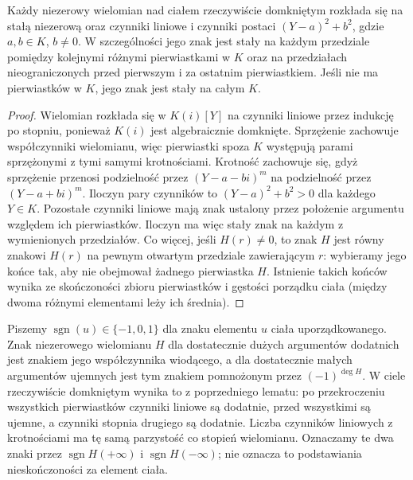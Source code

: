 \begin{lemat}
\label{lem:mod-qe-rcf-signs}
Każdy niezerowy wielomian nad ciałem rzeczywiście
domkniętym rozkłada się na stałą niezerową oraz czynniki
liniowe i czynniki postaci $(Y-a)^2+b^2$, gdzie
$a,b\in K$, $b\ne0$. W szczególności jego znak
jest stały na każdym przedziale pomiędzy kolejnymi
różnymi pierwiastkami w $K$ oraz na przedziałach
nieograniczonych przed pierwszym i za ostatnim
pierwiastkiem. Jeśli nie ma pierwiastków w $K$,
jego znak jest stały na całym $K$.
\end{lemat}
\begin{proof}
Wielomian rozkłada się w $K(i)[Y]$ na czynniki liniowe
przez indukcję po stopniu, ponieważ $K(i)$ jest algebraicznie
domknięte. Sprzężenie zachowuje współczynniki wielomianu,
więc pierwiastki spoza $K$ występują parami sprzężonymi
z tymi samymi krotnościami. Krotność zachowuje się,
gdyż sprzężenie przenosi podzielność przez
$(Y-a-bi)^m$ na podzielność przez $(Y-a+bi)^m$.
Iloczyn pary czynników to $(Y-a)^2+b^2>0$ dla
każdego $Y\in K$. Pozostałe czynniki liniowe mają znak
ustalony przez położenie argumentu względem ich
pierwiastków. Iloczyn ma więc stały znak na każdym
z wymienionych przedziałów. Co więcej, jeśli $H(r)\ne0$,
to znak $H$ jest równy znakowi $H(r)$ na pewnym
otwartym przedziale zawierającym $r$: wybieramy jego
końce tak, aby nie obejmował żadnego pierwiastka $H$.
Istnienie takich końców wynika ze skończoności
zbioru pierwiastków i gęstości porządku ciała
(między dwoma różnymi elementami leży ich średnia).
\end{proof}

Piszemy $\operatorname{sgn}(u)\in\{-1,0,1\}$ dla znaku
elementu $u$ ciała uporządkowanego. Znak niezerowego
wielomianu $H$ dla dostatecznie dużych argumentów
dodatnich jest znakiem jego współczynnika wiodącego,
a dla dostatecznie małych argumentów ujemnych jest
tym znakiem pomnożonym przez $(-1)^{\deg H}$.
W ciele rzeczywiście domkniętym wynika to z poprzedniego
lematu: po przekroczeniu wszystkich pierwiastków
czynniki liniowe są dodatnie, przed wszystkimi są
ujemne, a czynniki stopnia drugiego są dodatnie.
Liczba czynników liniowych z krotnościami ma tę samą
parzystość co stopień wielomianu.
Oznaczamy te dwa znaki przez $\operatorname{sgn}H(+\infty)$
i $\operatorname{sgn}H(-\infty)$; nie oznacza to
podstawiania nieskończoności za element ciała.


